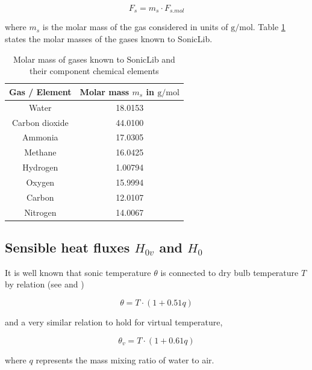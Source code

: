 \documentclass[a4paper,10pt]{book}
\begin{document}
\begin{equation}
 F_{s} = m_{s} \cdot F_{s.mol}
\end{equation} 

\noindent where $m_{s}$ is the molar mass of the gas considered in units of $\mbox{g/mol}$. Table \ref{tab:Molar masses} states the molar masses of the gases known to SonicLib.

\begin{table}
\centering
 \begin{tabular}{cc}
  \hline
  Gas / Element & Molar mass $m_{s}$ in  $\mbox{g/mol}$ \\
  \hline
  Water          & 18.0153 \\
  Carbon dioxide & 44.0100 \\
  Ammonia        & 17.0305 \\
  Methane        & 16.0425 \\
  \hline
  Hydrogen   &  1.00794 \\
  Oxygen     & 15.9994 \\
  Carbon     & 12.0107 \\
  Nitrogen   & 14.0067 \\
  \hline
 \end{tabular} 
\caption{Molar mass of gases known to SonicLib and their component chemical elements}
\label{tab:Molar masses}
\end{table} 

\subsection{Sensible heat fluxes $H_{0v}$ and $H_{0}$}\label{sub:H0}

It is well known that sonic temperature $\theta$ is connected to dry bulb temperature $T$ by relation (see \cite{Sozzi2002} and \cite{Kaimal1991})

\begin{equation}\label{eq:Sonic temperature}
 \theta = T \cdot \left( 1 + 0.51 q \right)
\end{equation} 

\noindent and a very similar relation to hold for virtual temperature,

\begin{equation}\label{eq:Virtual temperature}
 \theta_{v} = T \cdot \left( 1 + 0.61 q \right)
\end{equation} 

\noindent where $q$ represents the mass mixing ratio of water to air.
\end{document}
